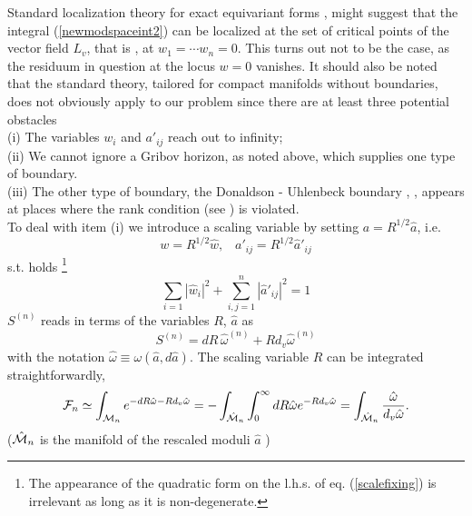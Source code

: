 \documentclass[a4paper,12pt]{article}
\begin{document}
Standard localization theory for exact equivariant forms 
\cite{berline}, \cite{schwarz} might suggest that the integral 
(\ref{newmodspaceint2}) can be localized at the set of critical 
points of the vector field $L_v$, that is , at $w_1=\cdots w_n=0$. 
This turns out not to be the case, as the residuum in question at 
the locus $w=0$ vanishes. It should also be noted that the standard 
theory, tailored for compact manifolds without boundaries, does 
not obviously apply to our problem since there are at least three 
potential obstacles \\
(i) The variables $w_i$ and $a'_{ij}$ reach out to infinity; \\
(ii) We cannot ignore a Gribov horizon, as noted above, which 
supplies one type of boundary. \\
(iii) The other type of boundary, the Donaldson - Uhlenbeck boundary 
\cite{donaldson}, \cite{uhlenbeck}, appears at places where the 
rank condition (see \cite{adhm}) is violated. \\
To deal with item (i) we introduce a scaling variable by setting 
$a=R^{1/2}\hat{a}$, i.e.  
\begin{equation}
w=R^{1/2}\hat{w}, \, \, \, \, \, a'_{ij}=R^{1/2}\hat{a}'_{ij}
\end{equation}
s.t. holds \footnote{The appearance of the quadratic form on 
the l.h.s. of eq. (\ref{scalefixing}) is irrelevant as long as 
it is non-degenerate.}
\begin{equation}
\sum_{i=1} \left| \hat{w}_i \right|^2 +\sum_{i,j=1}^n 
\left| \hat{a}'_{ij} \right|^2 = 1
\label{scalefixing} 
\end{equation}       
$S^{(n)}$ reads in terms of the variables $R$, $\hat{a}$ as 
\begin{equation}
S^{(n)}=dR \, \hat{\omega}^{(n)}+Rd_v \hat{\omega}^{(n)}
\end{equation}
with the notation $\hat{\omega} \equiv \omega \left(\hat{a}, 
d \hat{a} \right)$. The scaling variable $R$ can be 
integrated straightforwardly, 
\begin{eqnarray}
{\cal F}_n
\simeq \int_{{\cal M}_n} e^{-dR \hat{\omega}-
Rd_v \hat{\omega}}=-\int_{\hat{{\cal M}}_n}\int_0^{\infty} dR 
\hat{\omega}e^{-Rd_v \hat{\omega}}=\int_{\hat{{\cal M}}_n} 
\frac{\hat{\omega}}{d_v \hat{\omega}}.  
\label{newmodspaceint3}
\end{eqnarray}
($\hat{{\cal M}}_n$ is the manifold of the rescaled moduli $\hat{a}$ )
\end{document}
